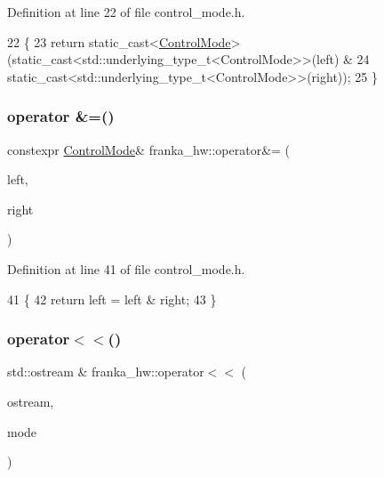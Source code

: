 Definition at line 22 of file control\+\_\+mode.\+h.


\begin{DoxyCode}
22                                                                      \{
23   \textcolor{keywordflow}{return} \textcolor{keyword}{static\_cast<}\hyperlink{namespacefranka__hw_afa416558ce4baace5ac6c71bd5d2c98c}{ControlMode}\textcolor{keyword}{>}(\textcolor{keyword}{static\_cast<}std::underlying\_type\_t<ControlMode>\textcolor{keyword}{>}(left) &
24                                   \textcolor{keyword}{static\_cast<}std::underlying\_type\_t<ControlMode>\textcolor{keyword}{>}(right));
25 \}
\end{DoxyCode}
\mbox{\label{namespacefranka__hw_a440231bfa3ba7c63421f78b81a3f1977}} 
\subsubsection{\texorpdfstring{operator \&=()}{operator \&=()}}
{\footnotesize\ttfamily constexpr \hyperlink{namespacefranka__hw_afa416558ce4baace5ac6c71bd5d2c98c}{Control\+Mode}\& franka\+\_\+hw\+::operator\&= (\begin{DoxyParamCaption}\item[{\hyperlink{namespacefranka__hw_afa416558ce4baace5ac6c71bd5d2c98c}{Control\+Mode} \&}]{left,  }\item[{\hyperlink{namespacefranka__hw_afa416558ce4baace5ac6c71bd5d2c98c}{Control\+Mode}}]{right }\end{DoxyParamCaption})}



Definition at line 41 of file control\+\_\+mode.\+h.


\begin{DoxyCode}
41                                                                         \{
42   \textcolor{keywordflow}{return} left = left & right;
43 \}
\end{DoxyCode}
\mbox{\label{namespacefranka__hw_a2dbef19b15b26447214b95ccc0973b20}} 
\subsubsection{\texorpdfstring{operator$<$$<$()}{operator<<()}}
{\footnotesize\ttfamily std\+::ostream \& franka\+\_\+hw\+::operator$<$$<$ (\begin{DoxyParamCaption}\item[{std\+::ostream \&}]{ostream,  }\item[{\hyperlink{namespacefranka__hw_afa416558ce4baace5ac6c71bd5d2c98c}{Control\+Mode}}]{mode }\end{DoxyParamCaption})}



